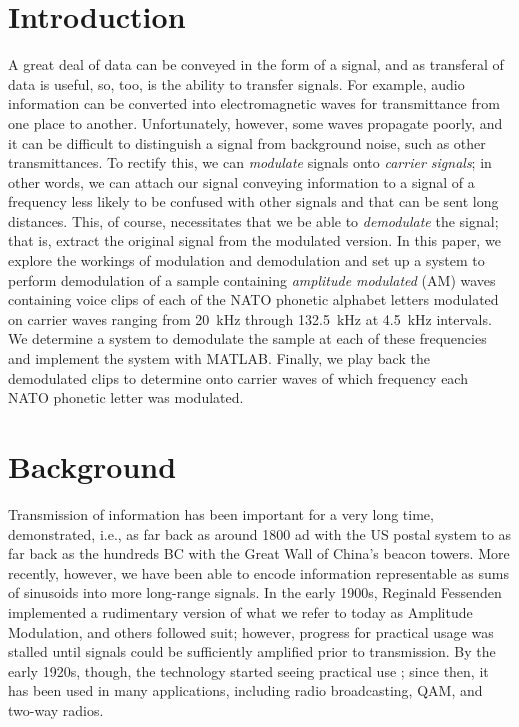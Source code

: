 \documentclass[journal]{IEEEtran}
\begin{document}
\section{Introduction}
A great deal of data can be conveyed in the form of a signal, and as transferal of data is useful, so, too, is the ability to transfer signals. For example, audio information can be converted into electromagnetic waves for transmittance from one place to another. Unfortunately, however, some waves propagate poorly, and it can be difficult to distinguish a signal from background noise, such as other transmittances. To rectify this, we can \textit{modulate} signals onto \textit{carrier signals}; in other words, we can attach our signal conveying information to a signal of a frequency less likely to be confused with other signals and that can be sent long distances. This, of course, necessitates that we be able to \textit{demodulate} the signal; that is, extract the original signal from the modulated version. In this paper, we explore the workings of modulation and demodulation and set up a system to perform demodulation of a sample containing \textit{amplitude modulated} (AM) waves containing voice clips of each of the NATO phonetic alphabet letters modulated on carrier waves ranging from \SI{20}{\kilo\hertz} through \SI{132.5}{\kilo\hertz} at \SI{4.5}{\kilo\hertz} intervals. We determine a system to demodulate the sample at each of these frequencies and implement the system with MATLAB. Finally, we play back the demodulated clips to determine onto carrier waves of which frequency each NATO phonetic letter was modulated.  

\section{Background}
Transmission of information has been important for a very long time, demonstrated, i.e., as far back as around 1800 ad with the US postal system to as far back as the hundreds BC with the Great Wall of China's beacon towers. More recently, however, we have been able to encode information representable as sums of sinusoids into more long-range signals. In the early 1900s, Reginald Fessenden implemented \cite{grant} a rudimentary version of what we refer to today as Amplitude Modulation, and others followed suit; however, progress for practical usage was stalled until signals could be sufficiently amplified prior to transmission. By the early 1920s, though, the technology started seeing practical use \cite{white}; since then, it has been used in many applications, including radio broadcasting, QAM, and two-way radios.
\end{document}
